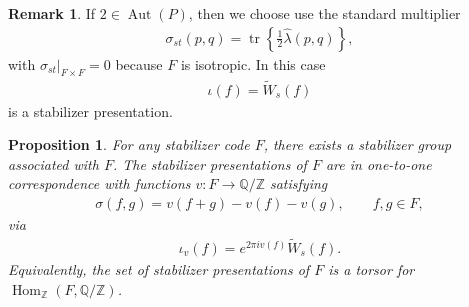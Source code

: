 \documentclass[sn-mathphys-num]{sn-jnl}
\newtheorem{proposition}[lemma]{Proposition}
\theoremstyle{definition}
\newtheorem{remark}[lemma]{Remark}
\numberwithin{equation}{section}
\theoremstyle{definition}
\def\IQ{\mathbb{Q}}
\def\IZ{{\mathbb{Z}}}
\def\hl{{\hat \lambda}}
\def\Hom{\operatorname{Hom}}
\def\tr{\operatorname{tr}}
\begin{document}
\begin{remark}
If $2\in\operatorname{Aut}(P)$, then we choose use the standard multiplier
\begin{align}
    \sigma_{st}(p,q)
    =
    \tr\left\{\frac{1}{2}\hl(p,q)\right\},
\end{align}
with $\sigma_{st}|_{F\times F}=0$ because $F$ is isotropic. In this case 
\begin{align}
    \iota(f)=\widetilde W_s(f)
\end{align}
is a stabilizer presentation.
\end{remark}

\begin{proposition}\label{prop:existence_stabilizer_presentation}
For any stabilizer code $F$, there exists a stabilizer group associated with
$F$. The stabilizer presentations of
$F$ are in one-to-one correspondence with functions
$v:F\to\IQ/\IZ$ satisfying
\begin{align}
    \sigma(f,g)=v(f+g)-v(f)-v(g),
    \qquad f,g\in F,
\end{align}
via
\begin{align}
    \iota_v(f)=e^{2\pi i v(f)}\widetilde W_s(f).
\end{align}
Equivalently, the set of stabilizer presentations of $F$ is a torsor for
$\Hom_{\IZ}(F,\IQ/\IZ)$.
\end{proposition}
\end{document}

